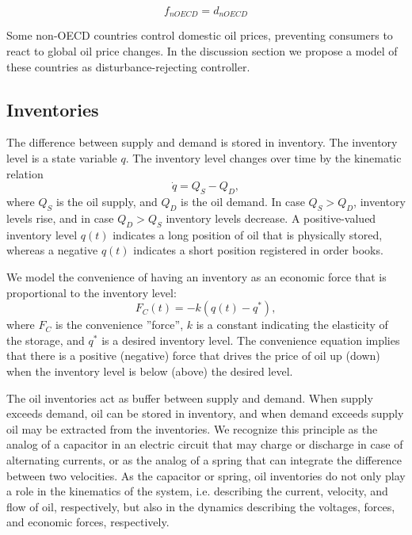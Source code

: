 \begin{equation}
    f_{nOECD} = d_{nOECD} 
\end{equation}


Some non-OECD countries control domestic oil prices, preventing consumers to react to global oil price changes.
In the discussion section we propose a model of these countries as disturbance-rejecting controller.





\subsection{Inventories}
The difference between supply and demand is stored in inventory.
The inventory level is a state variable $q$.
The inventory level changes over time by the kinematic relation
\begin{equation}
    \dot{q} = Q_S-Q_D,
\end{equation}
where $Q_S$ is the oil supply, and $Q_D$ is the oil demand.
In case $Q_S>Q_D$, inventory levels rise, and in case $Q_D>Q_S$ inventory levels decrease.
A positive-valued inventory level $q(t)$ indicates a long position of oil that is physically stored, whereas a negative $q(t)$ indicates a short position registered in order books.

We model the convenience of having an inventory as an economic force that is proportional to the inventory level:
\begin{equation}
    F_C(t) = -k (q(t)-q^*),
\end{equation}
where $F_C$ is the convenience ''force'', $k$ is a constant indicating the elasticity of the storage, and $q^*$ is a desired inventory level.
The convenience equation implies that there is a positive (negative) force that drives the price of oil up (down) when the inventory level is below (above) the desired level. 

The oil inventories act as buffer between supply and demand.
When supply exceeds demand, oil can be stored in inventory, and when demand exceeds supply oil may be extracted from the inventories.
We recognize this principle as the analog of a capacitor in an electric circuit that may charge or discharge in case of alternating currents, or as the analog of a spring that can integrate the difference between two velocities.
As the capacitor or spring, oil inventories do not only play a role in the kinematics of the system, i.e. describing the current, velocity, and flow of oil, respectively, but also in the dynamics describing the voltages, forces, and economic forces, respectively.





